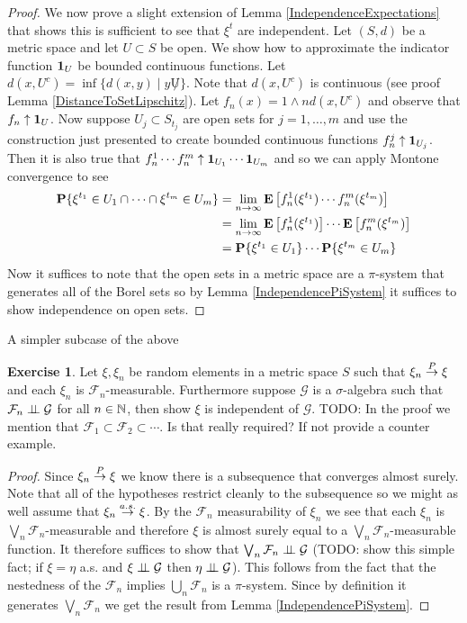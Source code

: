 \documentclass{amsart}
\theoremstyle{remark}
\theoremstyle{definition}
\newtheorem{ex}[thm]{Exercise}
\begin{document}
\begin{proof}
We now prove a slight extension of Lemma
\ref{IndependenceExpectations} that shows this is sufficient to see
that $\xi^t$ are independent.  Let $(S,d)$ be a metric space and let
$U \subset S$ be open.  We show how to approximate the indicator
function $\textbf{1}_{U}$ be bounded continuous functions.  Let
$d(x, U^c) = \inf \lbrace d(x,y) \mid y \not U \rbrace$.  Note that
$d(x, U^c)$ is continuous (see proof Lemma
\ref{DistanceToSetLipschitz}).  Let $f_n(x) = 1 \wedge n d(x, U^c)$
and observe that $f_n \uparrow \textbf{1}_{U}$.  Now suppose
$U_{j} \subset S_{t_j}$ are open sets for $j=1, \dotsc,m$ and use the
construction just presented to create bounded continuous functions
$f^j_n \uparrow \textbf{1}_{U_j}$.  Then it is also true that
$f^1_n \dotsm f^m_n \uparrow \textbf{1}_{U_1} \dotsm
\textbf{1}_{U_m}$ and so we can apply Montone convergence to see 
\begin{align*}
\textbf{P}\{\xi^{t_1} \in U_1 \cap \dotsb \cap \xi^{t_m} \in U_m\} &=
\lim_{n \to \infty} \textbf{E}\left[f^1_n(\xi^{t_1}) \dotsm
f^m_n(\xi^{t_m})\right] \\
&= \lim_{n \to \infty} \textbf{E}\left[f^1_n(\xi^{t_1}) \right] \dotsm
\textbf{E}\left[f^m_n(\xi^{t_m})\right] \\
&= \textbf{P}\{\xi^{t_1} \in U_1\} \dotsm\textbf{P}\{\xi^{t_m} \in
  U_m\} 
\end{align*}
Now it suffices to note that the open sets  in a metric space are a
$\pi$-system that generates all of the Borel sets so by Lemma
\ref{IndependencePiSystem} it suffices to
show independence on open sets.
\end{proof}

A simpler subcase of the above
\begin{ex}Let $\xi, \xi_n$ be random elements in a metric space $S$
  such that $\xi_n \overset{P}\to \xi$ and each $\xi_n$ is
  $\mathcal{F}_n$-measurable.  Furthermore suppose $\mathcal{G}$ is a
  $\sigma$-algebra such that $\mathcal{F}_n \perp \! \! \! \perp \mathcal{G}$
  for all $n \in \mathbb{N}$, then show $\xi$ is independent of
  $\mathcal{G}$.
TODO: In the proof we mention that $\mathcal{F}_1 \subset
\mathcal{F}_2 \subset \cdots$.  Is that really required?  If not
provide a counter example.
\end{ex}
\begin{proof}
Since $\xi_n \overset{P}\to \xi$ we know there is a subsequence  that
converges almost surely.  Note that all of the hypotheses restrict
cleanly to the subsequence so we might as well assume that $\xi_n
\overset{a.s.}\to \xi$.  By the $\mathcal{F}_n$ measurability of $\xi_n$ we see
that each $\xi_n$ is $\bigvee_n \mathcal{F}_n$-measurable and
therefore $\xi$ is almost surely equal to a $\bigvee_n
\mathcal{F}_n$-measurable function.  It therefore suffices to show
that $\bigvee_n
\mathcal{F}_n \perp \! \! \! \perp \mathcal{G}$ (TODO: show this simple fact; if $\xi
= \eta$ a.s. and $\xi \perp \! \! \! \perp \mathcal{G}$ then $\eta \perp \! \! \! \perp
\mathcal{G}$).  This follows from the fact
that the nestedness of the $\mathcal{F}_n$ implies $\bigcup_n
\mathcal{F}_n$ is a $\pi$-system.  Since by definition it generates $\bigvee_n
\mathcal{F}_n$ we get the result from Lemma \ref{IndependencePiSystem}.
\end{proof}
\end{document}
